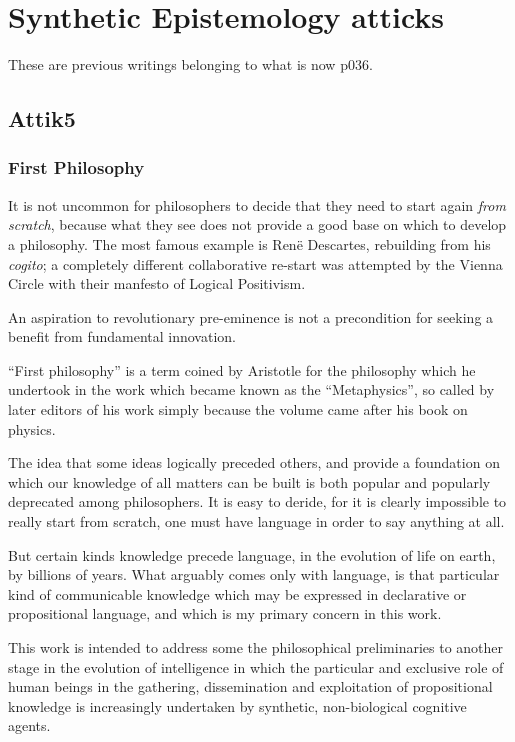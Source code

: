 \documentclass[10pt,titlepage]{book}
\begin{document}
\part{Synthetic Epistemology atticks}

These are previous writings belonging to what is now p036.

\chapter{Attik5}

\section{First Philosophy}

It is not uncommon for philosophers to decide that they need to start again \emph{from scratch}, because what they see does not provide a good base on which to develop a philosophy.
The most famous example is Ren\"{e} Descartes, rebuilding from his \emph{cogito}; a completely different collaborative re-start was attempted by the Vienna Circle with their manfesto of Logical Positivism.

An aspiration to revolutionary pre-eminence is not a precondition for seeking a benefit from fundamental innovation.

``First philosophy'' is a term coined by Aristotle for the philosophy which he undertook in the work which became known as the ``Metaphysics'', so called by later editors of his work simply because the volume came after his book on physics.

The idea that some ideas logically preceded others, and provide a foundation on which our knowledge of all matters can be built is both popular and popularly deprecated among philosophers.
It is easy to deride, for it is clearly impossible to really start from scratch, one must have language in order to say anything at all.

But certain kinds knowledge precede language, in the evolution of life on earth, by billions of years.
What arguably comes only with language, is that particular kind of communicable knowledge which may be expressed in declarative or propositional language, and which is my primary concern in this work.

This work is intended to address some the philosophical preliminaries to another stage in the evolution of intelligence in which the particular and exclusive role of human beings in the gathering, dissemination and exploitation of propositional knowledge is increasingly undertaken by synthetic, non-biological cognitive agents.
\end{document}
